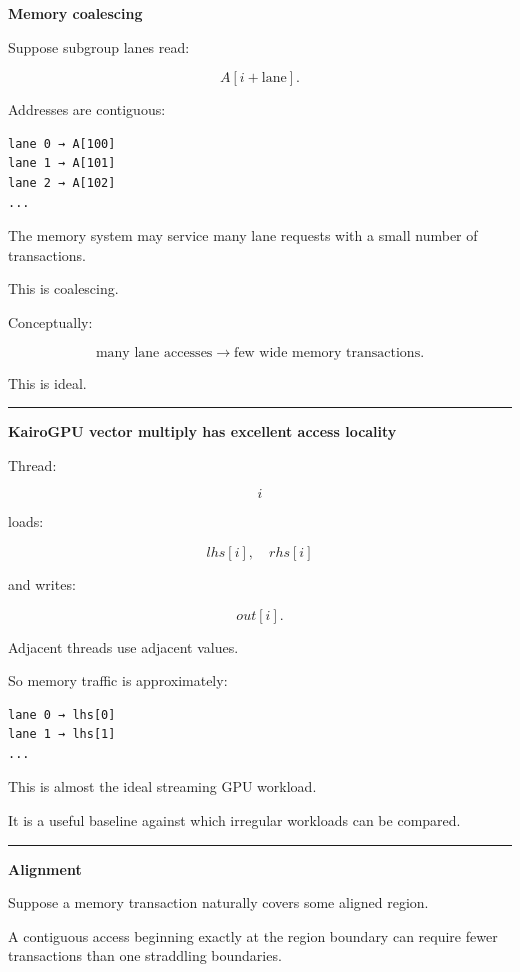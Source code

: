 \textbf{Memory coalescing}

Suppose subgroup lanes read:

\[
A[i+\text{lane}].
\]

Addresses are contiguous:

\protect{}\label{4d98r5}%
\begin{verbatim}
lane 0 → A[100]
lane 1 → A[101]
lane 2 → A[102]
...
\end{verbatim}

The memory system may service many lane requests with a small number of transactions.

This is coalescing.

Conceptually:

\[
\boxed{
\text{many lane accesses}
\rightarrow
\text{few wide memory transactions}.
}
\]

This is ideal.

\begin{center}\rule{0.5\linewidth}{0.5pt}\end{center}

\textbf{KairoGPU vector multiply has excellent access locality}

Thread:

\[
i
\]

loads:

\[
lhs[i],
\quad
rhs[i]
\]

and writes:

\[
out[i].
\]

Adjacent threads use adjacent values.

So memory traffic is approximately:

\protect{}\label{r4zgcd}%
\begin{verbatim}
lane 0 → lhs[0]
lane 1 → lhs[1]
...
\end{verbatim}

This is almost the ideal streaming GPU workload.

It is a useful baseline against which irregular workloads can be compared.

\begin{center}\rule{0.5\linewidth}{0.5pt}\end{center}

\textbf{Alignment}

Suppose a memory transaction naturally covers some aligned region.

A contiguous access beginning exactly at the region boundary can require fewer transactions than one straddling boundaries.

